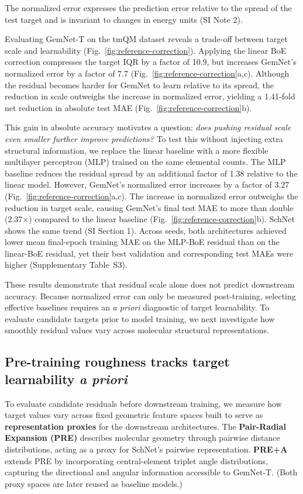 The normalized error expresses the prediction error relative to the spread of the test target and is invariant to changes in energy units (SI Note 2).

Evaluating GemNet-T on the tmQM dataset reveals a trade-off between target scale and learnability (Fig.~\ref{fig:reference-correction}). Applying the linear BoE correction compresses the target IQR by a factor of 10.9, but increases GemNet’s normalized error by a factor of 7.7 (Fig.~\ref{fig:reference-correction}a,c). Although the residual becomes harder for GemNet to learn relative to its spread, the reduction in scale outweighs the increase in normalized error, yielding a 1.41-fold net reduction in absolute test MAE (Fig.~\ref{fig:reference-correction}b).

This gain in absolute accuracy motivates a question: \emph{does pushing residual scale even smaller further improve predictions?} To test this without injecting extra structural information, we replace the linear baseline with a more flexible multilayer perceptron (MLP) trained on the same elemental counts. The MLP baseline reduces the residual spread by an additional factor of 1.38 relative to the linear model. However, GemNet’s normalized error increases by a factor of 3.27 (Fig.~\ref{fig:reference-correction}a,c). The increase in normalized error outweighs the reduction in target scale, causing GemNet’s final test MAE to more than double (2.37$\times$) compared to the linear baseline (Fig.~\ref{fig:reference-correction}b). SchNet shows the same trend (SI Section 1). Across seeds, both architectures achieved lower mean final-epoch training MAE on the MLP-BoE residual than on the linear-BoE residual, yet their best validation and corresponding test MAEs were higher (Supplementary Table~S3).

These results demonstrate that residual scale alone does not predict downstream accuracy. Because normalized error can only be measured post-training, selecting effective baselines requires an \emph{a priori} diagnostic of target learnability. To evaluate candidate targets prior to model training, we next investigate how smoothly residual values vary across molecular structural representations.

\subsection{Pre-training roughness tracks target learnability \emph{a priori}}
\label{sec:pretraining-roughness}

To evaluate candidate residuals before downstream training, we measure how target values vary across fixed geometric feature spaces built to serve as \textbf{representation proxies} for the downstream architectures. The \textbf{Pair-Radial Expansion (PRE)} describes molecular geometry through pairwise distance distributions, acting as a proxy for SchNet’s pairwise representation. \textbf{PRE+A} extends PRE by incorporating central-element triplet angle distributions, capturing the directional and angular information accessible to GemNet-T. (Both proxy spaces are later reused as baseline models.)

